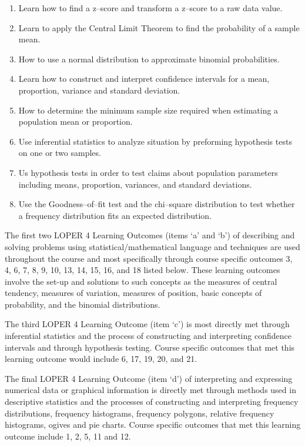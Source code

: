 \documentclass[11pt]{article}
\newenvironment{alphalist}{
\begin{enumerate}[label=(\arabic*),widest=107 ,leftmargin=25pt, itemsep=0pt]}
{\end{enumerate}}
\begin{document}
\begin{alphalist}
\item Learn how to find a z--score and transform a z--score to a 
raw data value.

\item Learn to apply the Central Limit Theorem to find the 
probability of a sample mean.

\item How to use a normal distribution to approximate binomial 
probabilities.

\item Learn how to construct and interpret confidence intervals 
for a mean, proportion,  variance and standard deviation.

\item How to determine the minimum sample size required when 
estimating a population mean  or proportion.

\item Use inferential statistics to analyze situation by preforming 
hypothesis tests on one or  two samples. 

\item Us hypothesis tests in order to test claims about population 
parameters including means,  proportion, variances, and standard 
deviations.

\item Use the Goodness--of--fit test and the chi--square 
distribution to test whether a frequency distribution fits an 
expected distribution.
 \end{alphalist}

 The first two LOPER 4 Learning Outcomes (items `a' and `b') of 
 describing and solving problems using statistical/mathematical 
 language and techniques are used throughout the course and most 
 specifically through course specific outcomes 3, 4, 6, 7, 8, 9, 
 10, 13, 14, 15, 16, and 18 listed below.  These learning outcomes 
 involve the set-up and solutions to such concepts as the measures 
 of central tendency, measures of variation, measures of position, 
 basic concepts of probability, and the binomial distributions.  

 

 The third LOPER 4 Learning Outcome (item `c') is most directly met 
 through inferential statistics and the process of constructing and 
 interpreting confidence intervals and through hypothesis testing. 
 Course specific outcomes that met this learning outcome would 
 include 6, 17, 19, 20, and 21. 
 
 The final LOPER 4 Learning Outcome (item `d') of interpreting and 
 expressing numerical data or graphical information is directly met 
 through methods used in descriptive statistics and the processes 
 of  constructing and interpreting frequency distributions, 
 frequency histograms, frequency polygons, relative frequency 
 histograms, ogives and pie charts.  Course specific outcomes 
 that met this learning outcome include 1, 2, 5, 11 and 12. 
  
\end{document}
